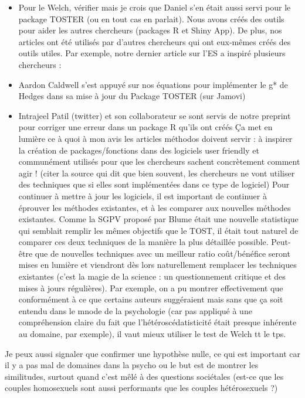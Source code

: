 \documentclass[
  12pt,
  french,
]{article}
\providecommand{\tightlist}{%
  \setlength{\itemsep}{0pt}\setlength{\parskip}{0pt}}
\begin{document}
\begin{itemize}
\tightlist
\item
  Pour le Welch, vérifier mais je crois que Daniel s'en était aussi
  servi pour le package TOSTER (ou en tout cas en parlait). Nous avons
  créés des outils pour aider les autres chercheurs (packages R et Shiny
  App). De plus, nos articles ont été utilisés par d'autres chercheurs
  qui ont eux-mêmes créés des outils utiles. Par exemple, notre dernier
  article sur l'ES a inspiré plusieurs chercheurs :
\item
  Aardon Caldwell s'est appuyé sur nos équations pour implémenter le g*
  de Hedges dans sa mise à jour du Package TOSTER (sur Jamovi)
\item
  Intrajeel Patil (twitter) et son collaborateur se sont servis de notre
  preprint pour corriger une erreur dans un package R qu'ils ont créés
  Ça met en lumière ce à quoi à mon avis les articles méthodos doivent
  servir : à inspirer la création de packages/fonctions dans des
  logiciels user friendly et communément utilisés pour que les
  chercheurs sachent concrètement comment agir ! (citer la source qui
  dit que bien souvent, les chercheurs ne vont utiliser des techniques
  que si elles sont implémentées dans ce type de logiciel) Pour
  continuer à mettre à jour les logiciels, il est important de continuer
  à éprouver les méthodes existantes, et à les comparer aux nouvelles
  méthodes existantes. Comme la SGPV proposé par Blume était une
  nouvelle statistique qui semblait remplir les mêmes objectifs que le
  TOST, il était tout naturel de comparer ces deux techniques de la
  manière la plus détaillée possible. Peut-être que de nouvelles
  techniques avec un meilleur ratio coût/bénéfice seront mises en
  lumière et viendront dès lors naturellement remplacer les techniques
  existantes (c'est la magie de la science : un questionnement critique
  et des mises à jours régulières). Par exemple, on a pu montrer
  effectivement que conformément à ce que certains auteurs suggéraient
  mais sans que ça soit entendu dans le mnode de la psychologie (car pas
  appliqué à une compréhension claire du fait que l'hétéroscédatisticité
  était presque inhérente au domaine, par exemple), il vaut mieux
  utiliser le test de Welch tt le tps.
\end{itemize}

Je peux aussi signaler que confirmer une hypothèse nulle, ce qui est
important car il y a pas mal de domaines dans la psycho ou le but est de
montrer les similitudes, surtout quand c'est mêlé à des questions
sociétales (est-ce que les couples homosexuels sont aussi performants
que les couples hétérosexuels ?)
\end{document}
